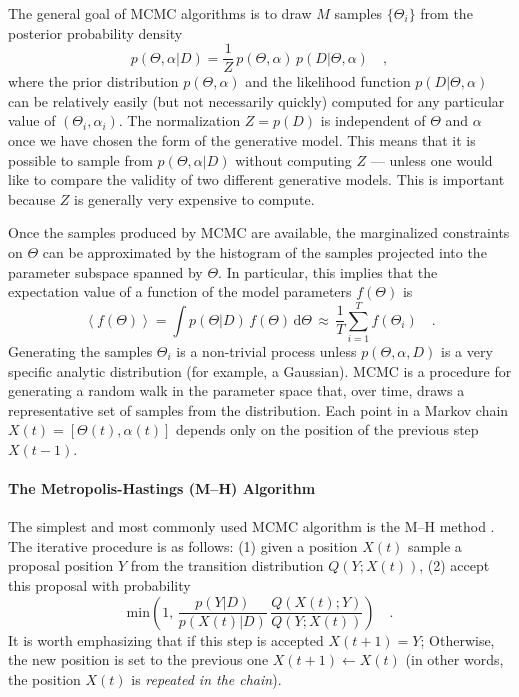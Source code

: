 \documentclass[12pt,preprint]{aastex}
\newcommand{\algo}[1]{Algorithm \ref{algo:#1}}
\newcommand{\dd}{\mathrm{d}}
\renewcommand{\vector}[1]{#1}
\newcommand{\pr}[1]{\ensuremath{p(#1)}}
\newcommand{\expect}[1]{\left<#1\right>}
\newcommand{\model}{\ensuremath{\vector{\Theta}}}
\newcommand{\data}{\ensuremath{\vector{D}}}
\newcommand{\nuisance}{\ensuremath{\vector{\alpha}}}
\newcommand{\link}{\ensuremath{X}}
\begin{document}
The general goal of MCMC algorithms is to draw $M$ samples
$\{ \model_i \}$ from
the posterior probability density
\begin{equation}
    \pr{\model, \nuisance | \data} = \frac{1}{Z}\,\pr{\model, \nuisance}
            \, \pr{\data | \model, \nuisance} \quad,
\end{equation}
where the prior distribution $\pr{\model, \nuisance}$ and the likelihood
function $\pr{\data|\model,\nuisance}$ can be relatively easily (but not
necessarily quickly) computed for any particular value of
$(\model_i, \nuisance_i)$.  The normalization $Z=\pr{\data}$ is
independent of $\model$ and $\nuisance$ once we have chosen the form of the
generative model. This means that it is possible
to sample from \pr{\model, \nuisance | \data} without computing $Z$ ---
unless one would like to compare the validity of two different generative
models. This is important because $Z$ is generally very expensive to
compute.

Once the samples
produced by MCMC are available, the marginalized constraints on $\model$
can be approximated by
the histogram of the samples projected into the parameter subspace spanned
by $\model$. In particular, this implies that the
expectation value of a function of the model parameters $f(\model)$ is
\begin{equation}
    \expect{f(\model)} = \int
    \pr{\model|\data}
    \, f(\model) \, \dd\model
    \,\approx\, \frac{1}{T} \sum_{i=1} ^T f(\model_i) \quad.
\end{equation}
Generating the samples $\model_i$ is a non-trivial process unless
$\pr{\model, \nuisance, \data}$ is a very specific analytic distribution
(for example, a Gaussian). MCMC is a procedure for generating a random walk
in the parameter space that, over time, draws a representative set
of samples from the distribution. Each point in a Markov chain
$\link (t) = [\model(t), \nuisance(t)]$
depends only on the position of the previous step $\link (t-1)$.

\paragraph{The Metropolis-Hastings (M--H) Algorithm}

The simplest and most commonly used MCMC algorithm is the M--H method
\citep[\algo{mh};][]{MacKay:2003,Gregory:2005,Press:2007,Hogg:2010}.
The iterative procedure is as follows: (1) given a position
$X(t)$ sample a proposal position $Y$ from the transition distribution
$Q(Y; X(t))$, (2) accept this proposal with probability
\begin{equation}
    \mathrm{min} \left( 1,\,
            \frac{\pr{\vector{Y} | \data}}{\pr{\vector{X}(t) | \data}} \,
            \frac{Q(X(t); Y)}{ Q(Y;X(t))}  \right) \quad.
\end{equation}
It is worth emphasizing that if this step is accepted $X(t+1) = Y$; Otherwise,
the new position is set to the previous one $X(t+1) \gets X(t)$ (in other
words, the position $X(t)$ is \emph{repeated in the chain}).
\end{document}
